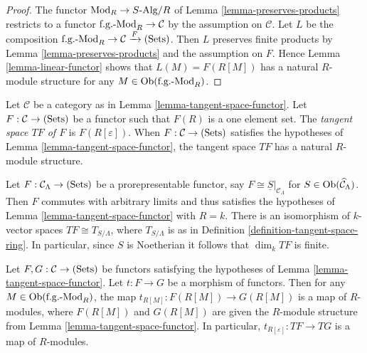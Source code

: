 \begin{proof}
The functor $\textnormal{Mod}_{R} \rightarrow S \textnormal{-Alg}/R$ of Lemma 
\ref{lemma-preserves-products} restricts to a functor 
$\textnormal{f.g.-Mod}_{R} \rightarrow \mathcal C$ by the assumption on 
$\mathcal C$. Let $L$ be the composition $\textnormal{f.g.-Mod}_{R} \rightarrow 
\mathcal C \xrightarrow{F} \textnormal{(Sets)}$. Then $L$ preserves finite 
products by Lemma \ref{lemma-preserves-products} and the assumption on $F$.  
Hence Lemma \ref{lemma-linear-functor} shows that $L(M) = F(R[M])$ has a 
natural $R$-module structure for any $M \in 
\textnormal{Ob}(\textnormal{f.g.-Mod}_{R})$.
\end{proof}

\begin{definition}
Let $\mathcal C$ be a category as in Lemma \ref{lemma-tangent-space-functor}.  
Let $F: \mathcal C \rightarrow \textnormal{(Sets)}$ be a functor such that 
$F(R)$ is a one element set. The \emph{tangent space $TF$ of $F$} is 
$F(R[\varepsilon])$.  When $F: \mathcal C \rightarrow \textnormal{(Sets)}$ 
satisfies the hypotheses of Lemma \ref{lemma-tangent-space-functor}, the 
tangent space $TF$ has a natural $R$-module structure.
\end{definition}

\begin{example}
\label{example-tangent-space-prorepresentable-functor}
Let $F: \mathcal C_{\Lambda} \rightarrow \textnormal{(Sets)}$ be a 
prorepresentable functor, say $F \cong \underline{S}|_{\mathcal C_{\Lambda}}$ 
for $S \in \textnormal{Ob}(\widehat{\mathcal C}_{\Lambda})$.  Then $F$ commutes 
with arbitrary limits and thus satisfies the hypotheses of Lemma 
\ref{lemma-tangent-space-functor} with $R = k$.  There is an isomorphism of 
$k$-vector spaces $TF \cong T_{S/\Lambda}$, where $T_{S/\Lambda}$ is as in 
Definition \ref{definition-tangent-space-ring}.  In particular, since $S$ is 
Noetherian it follows that $\dim_{k} TF$ is finite.
\end{example}


\begin{lemma}
\label{lemma-morphism-tangent-spaces}
Let $F, G: \mathcal C \rightarrow \textnormal{(Sets)}$ be functors satisfying 
the hypotheses of Lemma \ref{lemma-tangent-space-functor}.  Let $t: F 
\rightarrow G$ be a morphism of functors.  Then for any $M \in 
\textnormal{Ob}(\textnormal{f.g.-Mod}_{R})$, the map $t_{R[M]}: F(R[M]) 
\rightarrow G(R[M])$ is a map of $R$-modules, where $F(R[M])$ and $G(R[M])$ are 
given the $R$-module structure from Lemma \ref{lemma-tangent-space-functor}.  
In particular, $t_{R[\varepsilon]} : TF \rightarrow TG$ is a map of $R$-modules.
\end{lemma}

